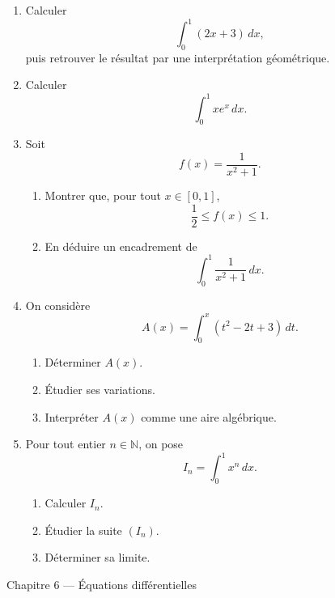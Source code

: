 \documentclass[11pt,a4paper]{article}
\newcommand{\N}{\mathbb{N}}
\begin{document}
\begin{enumerate}[label=\textbf{Exercice \arabic*.}, leftmargin=*, itemsep=1em]

\item Calculer
\[
\int_0^1 (2x+3)\,dx,
\]
puis retrouver le résultat par une interprétation géométrique.

\item Calculer
\[
\int_0^1 xe^x\,dx.
\]

\item Soit
\[
f(x)=\frac{1}{x^2+1}.
\]

\begin{enumerate}[label=\alph*)]
    \item Montrer que, pour tout \(x\in[0,1]\),
    \[
    \frac12\leq f(x)\leq 1.
    \]
    \item En déduire un encadrement de
    \[
    \int_0^1 \frac{1}{x^2+1}\,dx.
    \]
\end{enumerate}

\item On considère
\[
A(x)=\int_0^x (t^2-2t+3)\,dt.
\]

\begin{enumerate}[label=\alph*)]
    \item Déterminer \(A(x)\).
    \item Étudier ses variations.
    \item Interpréter \(A(x)\) comme une aire algébrique.
\end{enumerate}

\item Pour tout entier \(n\in\N\), on pose
\[
I_n=\int_0^1 x^n\,dx.
\]

\begin{enumerate}[label=\alph*)]
    \item Calculer \(I_n\).
    \item Étudier la suite \((I_n)\).
    \item Déterminer sa limite.
\end{enumerate}

\end{enumerate}

\begin{chapitrebox}{Chapitre 6 --- Équations différentielles}
\end{chapitrebox}
\end{document}
